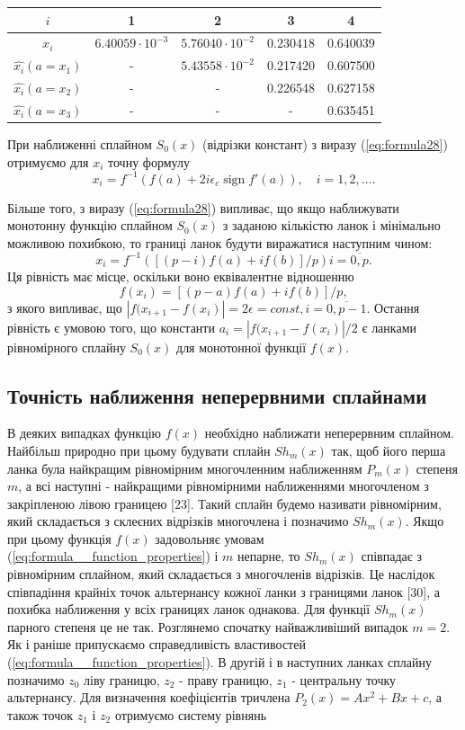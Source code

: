 \documentclass[ukrainian,14pt]{extarticle}
\newcommand{\sign}{\operatorname{sign}}
\begin{document}
\bgroup
\def\arraystretch{1.5}
\begin{center}
\begin{tabular}{ c | c |
c | c | c }
 $i$ & 1 & 2 & 3 & 4 \\
 \hline
 $x_i$ & $6.40059 \cdot 10^{-3}$ & $5.76040 \cdot 10^{-2}$ & $0.230418$ & $0.640039$ \\  
 \hline
  $\hat{x_i} (a = x_1)$ & - & $5.43558 \cdot 10^{-2}$ & 0.217420 & 0.607500 \\  
 \hline
 $\hat{x_i} (a = x_2)$ & - & - & 0.226548 & 0.627158   \\
 \hline
   $\hat{x_i} (a = x_3)$ & - & - & - & 0.635451 \\  
\end{tabular}
\end{center}
\egroup

При наближенні сплайном $S_0(x)$ (відрізки констант) з виразу (\ref{eq:formula28}) отримуємо для $x_i$ точну формулу
$$x_i = f^{-1} (f(a) + 2i\epsilon_c \sign{f'(a)}), \quad i = 1,2, \ldots .$$

Більше того, з виразу (\ref{eq:formula28}) випливає, що якщо наближувати монотонну функцію сплайном $S_0(x)$ з заданою кількістю ланок і мінімально можливою похибкою, то границі ланок будути виражатися наступним чином:
$$x_i = f^{-1}([(p - i)f(a) + if(b)] / p) i = \overline{0, p}.$$
Ця рівність має місце, оскільки воно еквівалентне відношенню 
$$f(x_i) = [(p-a)f(a) + if(b)]/p,$$
з якого випливає, що $|f(x_{i+1} - f(x_i)| = 2\epsilon = const, i = \overline{0, p-1}$. Остання рівність є умовою того, що константи $a_i = |f(x_{i+1}- f(x_i)| / 2$ є ланками рівномірного сплайну $S_0(x)$ для монотонної функції $f(x)$.

\subsection{Точність наближення неперервними сплайнами}

В деяких випадках функцію $f(x)$ необхідно наближати неперервним сплайном. Найбільш природно при цьому будувати сплайн $S h_m(x)$ так, щоб його перша ланка була найкращим рівномірним многочленним наближенням $P_m(x)$ степеня $m$, а всі наступні - найкращими рівномірними наближеннями многочленом з закріпленою лівою границею [23]. Такий сплайн будемо називати рівномірним, який складається з склеєних відрізків многочлена і позначимо $S h_m(x)$. Якщо при цьому функція $f(x)$ задовольняє умовам (\ref{eq:formula__function_properties}) і $m$ непарне, то $S h_m(x)$ співпадає з рівномірним сплайном, який складається з многочленів відрізків. Це наслідок співпадіння крайніх точок альтернансу кожної ланки з границями ланок [30], а похибка наближення у всіх границях ланок однакова. Для функції $S h_m(x)$ парного степеня це не так. Розглянемо спочатку найважливіший випадок $m = 2$. Як і раніше припускаємо справедливість властивостей (\ref{eq:formula__function_properties}).  В другій і в наступних ланках сплайну позначимо $z_0$ ліву границю, $z_2$ - праву границю, $z_1$ - центральну точку альтернансу. Для визначення коефіцієнтів тричлена $P_2(x) = Ax^2 + Bx + c$, а також точок $z_1$ і $z_2$ отримуємо систему рівнянь
\end{document}
